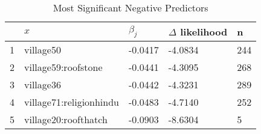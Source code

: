 \begin{table}[ht]
\centering
\begin{tabular}{rllll}
  \hline
 & $x$ & $\beta_j$ & $\Delta$ likelihood & n \\ 
  \hline
1 & village50 & -0.0417 & -4.0834 & 244 \\ 
  2 & village59:roofstone & -0.0441 & -4.3095 & 268 \\ 
  3 & village36 & -0.0442 & -4.3231 & 289 \\ 
  4 & village71:religionhindu & -0.0483 & -4.7140 & 252 \\ 
  5 & village20:roofthatch & -0.0903 & -8.6304 & 5 \\ 
   \hline
\end{tabular}
\caption{Most Significant Negative Predictors} 
\label{tab:neg}
\end{table}
